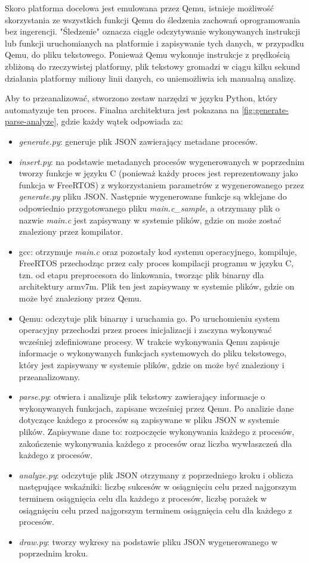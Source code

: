 \documentclass[../../main]{subfiles}
\begin{document}
Skoro platforma docelowa jest emulowana przez Qemu, istnieje możliwość skorzystania ze wszystkich funkcji Qemu do śledzenia zachowań oprogramowania bez ingerencji. "Śledzenie" oznacza ciągle odczytywanie wykonywanych instrukcji lub funkcji uruchomianych na platformie i zapisywanie tych danych, w przypadku Qemu, do pliku tekstowego. Ponieważ Qemu wykonuje instrukcje z prędkością zbliżoną do rzeczywistej platformy, plik tekstowy gromadzi w ciągu kilku sekund działania platformy miliony linii danych, co uniemożliwia ich manualną analizę.

Aby to przeanalizować, stworzono zestaw narzędzi w języku Python, który automatyzuje ten proces. Finalna architektura jest pokazana na \cref{fig:generate-parse-analyze}, gdzie każdy wątek odpowiada za:

\begin{itemize}
    \item \textit{generate.py}: generuje plik JSON zawierający metadane procesów.
    \item \textit{insert.py}: na podstawie metadanych procesów wygenerowanych w poprzednim tworzy funkcje w języku C (ponieważ każdy proces jest reprezentowany jako funkcja w FreeRTOS) z wykorzystaniem parametrów z wygenerowanego przez \textit{generate.py} pliku JSON. Następnie wygenerowane funkcje są wklejane do odpowiednio przygotowanego pliku \textit{main.c\_sample}, a otrzymany plik o nazwie \textit{main.c} jest zapisywany w systemie plików, gdzie on może zostać znaleziony przez kompilator.
    \item \acrshort{gcc}: otrzymuje \textit{main.c} oraz pozostały kod systemu operacyjnego, kompiluje, FreeRTOS przechodząc przez cały proces kompilacji programu w języku C, tzn. od etapu preprocesora do linkowania, tworząc plik binarny dla architektury \acrshort{arm}v7\acrshort{m}. Plik ten jest zapisywany w systemie plików, gdzie on może być znaleziony przez Qemu.
    \item Qemu: odczytuje plik binarny i uruchamia go. Po uruchomieniu system operacyjny przechodzi przez proces inicjalizacji i zaczyna wykonywać wcześniej zdefiniowane procesy. W trakcie wykonywania Qemu zapisuje informacje o wykonywanych funkcjach systemowych do pliku tekstowego, który jest zapisywany w systemie plików, gdzie on może być znaleziony i przeanalizowany.
    \item \textit{parse.py}: otwiera i analizuje plik tekstowy zawierający informacje o wykonywanych funkcjach, zapisane wcześniej przez Qemu. Po analizie dane dotyczące każdego z procesów są zapisywane w pliku JSON w systemie plików. Zapisywane dane to: rozpoczęcie wykonywania każdego z procesów, zakończenie wykonywania każdego z procesów oraz liczba wywłaszczeń dla każdego z procesów.
    \item \textit{analyze.py}: odczytuje plik JSON otrzymany z poprzedniego kroku i oblicza następujące wskaźniki: liczbę sukcesów w osiągnięciu celu przed najgorszym terminem osiągnięcia celu dla każdego z procesów, liczbę porażek w osiągnięciu celu przed najgorszym terminem osiągnięcia celu dla każdego z procesów.
    \item \textit{draw.py}: tworzy wykresy na podstawie pliku JSON wygenerowanego w poprzednim kroku.
\end{itemize}
\end{document}
